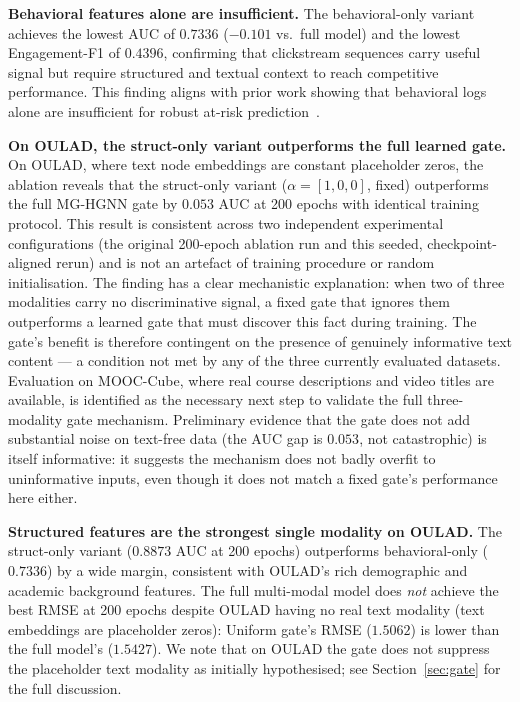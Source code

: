 \documentclass[sigconf,review]{acmart}
\begin{document}
\textbf{Behavioral features alone are insufficient.}
The behavioral-only variant achieves the lowest AUC of
$0.7336$ ($-0.101$ vs.\ full model) and the lowest
Engagement-F1 of $0.4396$, confirming that clickstream
sequences carry useful signal but require structured
and textual context to reach competitive performance.
This finding aligns with prior work showing that
behavioral logs alone are insufficient for robust
at-risk prediction~\citep{huang2024temporal}.

\textbf{On OULAD, the struct-only variant outperforms
the full learned gate.}
On OULAD, where text node embeddings are constant
placeholder zeros, the ablation reveals that the
struct-only variant ($\alpha = [1,0,0]$, fixed)
outperforms the full MG-HGNN gate by $0.053$
AUC at 200 epochs with identical training protocol.
This result is consistent across two independent
experimental configurations (the original 200-epoch
ablation run and this seeded, checkpoint-aligned rerun)
and is not an artefact of training procedure or random
initialisation. The finding has a clear mechanistic
explanation: when two of three modalities carry no
discriminative signal, a fixed gate that ignores them
outperforms a learned gate that must discover this fact
during training. The gate's benefit is therefore
contingent on the presence of genuinely informative text
content --- a condition not met by any of the three
currently evaluated datasets. Evaluation on MOOC-Cube,
where real course descriptions and video titles are
available, is identified as the necessary next step to
validate the full three-modality gate mechanism.
Preliminary evidence that the gate does not add
substantial noise on text-free data (the AUC gap is
$0.053$, not catastrophic) is itself informative: it
suggests the mechanism does not badly overfit to
uninformative inputs, even though it does not match a
fixed gate's performance here either.

\textbf{Structured features are the strongest single
modality on OULAD.}
The struct-only variant ($0.8873$ AUC at 200 epochs)
outperforms behavioral-only ($0.7336$) by a wide margin,
consistent with OULAD's rich demographic and academic
background features. The full multi-modal model does
\emph{not} achieve the best RMSE at 200 epochs despite
OULAD having no real text modality (text embeddings are
placeholder zeros): Uniform gate's RMSE ($1.5062$) is
lower than the full model's ($1.5427$). We note that
on OULAD the gate does not suppress the placeholder
text modality as initially hypothesised; see
Section~\ref{sec:gate} for the full discussion.
\end{document}
